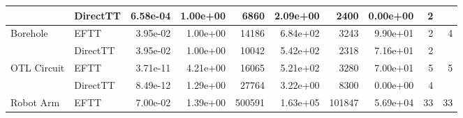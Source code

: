 \begin{table}[!ht]
{\begin{tabular}{llrrrrrrrr}
                                   & DirectTT                        & 6.58e-04                    & 1.00e+00                                           & 6860                           & 2.09e+00                                            & 2400                          & 0.00e+00                                         & 2                                        &                                          \\ \hline
    \multirow{2}{*}{Borehole}      & EFTT                            & 3.95e-02                    & 1.00e+00                                           & 14186                          & 6.84e+02                                            & 3243                          & 9.90e+01                                         & 2                                        & 4                                        \\ %
                                   & DirectTT                        & 3.95e-02                    & 1.00e+00                                           & 10042                          & 5.42e+02                                            & 2318                          & 7.16e+01                                         & 2                                        &                                          \\ \hline
    \multirow{2}{*}{OTL Circuit}   & EFTT                            & 3.71e-11                    & 4.21e+00                                           & 16065                          & 5.21e+02                                            & 3280                          & 7.00e+01                                         & 5                                        & 5                                        \\ %
                                   & DirectTT                        & 8.49e-12                    & 1.29e+00                                           & 27764                          & 3.22e+00                                            & 8300                          & 0.00e+00                                         & 4                                        &                                          \\ \hline
    \multirow{2}{*}{Robot Arm}     & EFTT                            & 7.00e-02                    & 1.39e+00                                           & 500591                         & 1.63e+05                                            & 101847                        & 5.69e+04                                         & 33                                       & 33                                       \\ %

\end{tabular}}
\end{table}
